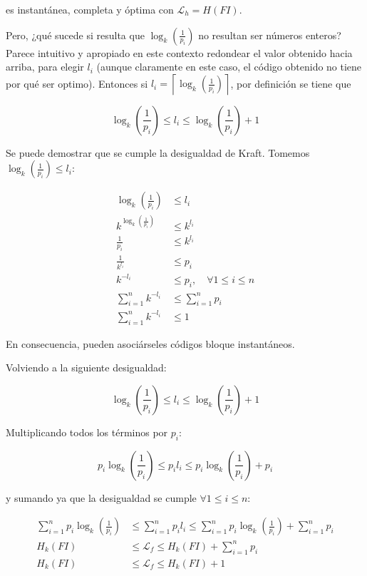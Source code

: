 es instantánea, completa y óptima con
\(\mathcal{L}_h=H\left(FI\right)\).

Pero, ¿qué sucede si resulta que \(\log_k\left(\frac{1}{p_i}\right)\) no
resultan ser números enteros? Parece intuitivo y apropiado en este
contexto redondear el valor obtenido hacia arriba, para elegir \(l_i\)
(aunque claramente en este caso, el código obtenido no tiene por qué ser
optimo). Entonces si
\(l_i=\left\lceil\log_k\left(\frac{1}{p_i}\right)\right\rceil\), por
definición se tiene que

\[
\log_k\left(\frac{1}{p_i}\right)\leq l_i\leq\log_k\left(\frac{1}{p_i}\right) + 1
\]

Se puede demostrar que se cumple la desigualdad de Kraft. Tomemos
\(\log_k\left(\frac{1}{p_i}\right)\leq l_i\):


\begin{align*}
\log_k\left(\frac{1}{p_i}\right)&\leq l_i\\
k^{\log_k\left(\frac{1}{p_i}\right)}&\leq k^{l_i}\\
\frac{1}{p_i}&\leq k^{l_i}\\
\frac{1}{k^{l_i}}&\leq p_i\\
k^{-l_i}&\leq p_i,\quad\forall 1\leq i\leq n\\
\sum_{i=1}^nk^{-l_i}&\leq\sum_{i=1}^n p_i\\
\sum_{i=1}^nk^{-l_i}&\leq 1
\end{align*}


En consecuencia, pueden asociárseles códigos bloque instantáneos.

Volviendo a la siguiente desigualdad:

\[
\log_k\left(\frac{1}{p_i}\right)\leq l_i\leq\log_k\left(\frac{1}{p_i}\right) + 1
\]

Multiplicando todos los términos por \(p_i\):

\[
p_i\log_k\left(\frac{1}{p_i}\right)\leq p_il_i\leq p_i\log_k\left(\frac{1}{p_i}\right) + p_i
\]

y sumando ya que la desigualdad se cumple \(\forall 1\leq i\leq n\):


\begin{align*}
\sum_{i=1}^np_i\log_k\left(\frac{1}{p_i}\right)&\leq\sum_{i=1}^np_il_i\leq \sum_{i=1}^np_i\log_k\left(\frac{1}{p_i}\right) + \sum_{i=1}^np_i\\
H_k\left(FI\right)&\leq\mathcal{L}_f\leq H_k\left(FI\right) + \sum_{i=1}^np_i\\
H_k\left(FI\right)&\leq\mathcal{L}_f\leq H_k\left(FI\right) + 1\\
\end{align*}


